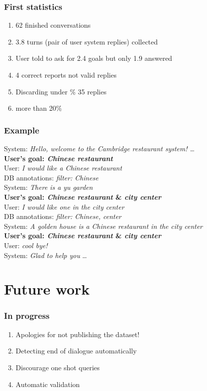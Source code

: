 \documentclass[10pt, compress,british,xcolor={svgnames,dvipsnames,x11names},trans]{beamer}
\def\sys#1{{\color{purple}System: \it #1}}
\def\usr#1{{\color{brown}User: \it #1}}
\def\api#1{{\color{blue}DB annotations: \it #1}}
\begin{document}
\begin{frame}\frametitle{First statistics}
    \begin{enumerate}
        \item 62 finished conversations
        \item 3.8 turns (pair of user system replies) collected
        \item User told to ask for 2.4 goals but only 1.9 answered 
        \item 4 correct reports not valid replies
        \item Discarding under \% 35 replies
        \item more than 20\%  
    \end{enumerate}
\end{frame}

\begin{frame}\frametitle{Example}
    \sys{Hello, welcome to the Cambridge restaurant system! \dots } \\
    {\bf User's goal: {\it Chinese restaurant}} \\
    \usr{I would like a Chinese restaurant} \\
    \api{filter: Chinese} \\
    \sys{There is a yu garden} \\
    {\bf User's goal: {\it Chinese restaurant} \& {\it city center}} \\
    \usr{I would like one in the city center} \\
    \api{filter: Chinese, center} \\
    \sys{A golden house is a Chinese restaurant in the city center} \\
    {\bf User's goal: {\it Chinese restaurant} \& {\it city center}} \\
    \usr{cool bye!} \\
    \sys{Glad to help you}
    \dots
\end{frame}

\section{Future work}

\begin{frame}\frametitle{In progress}
    \begin{enumerate}
        \item Apologies for not publishing the dataset!
        \item Detecting end of dialogue automatically
        \item Discourage one shot queries
        \item Automatic validation
    \end{enumerate}
\end{frame}
\end{document}

